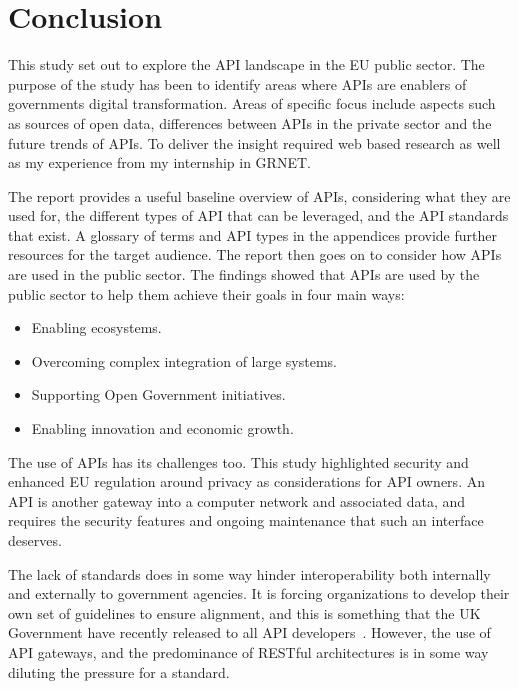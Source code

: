 \chapter{Conclusion}

\ifpdf
\graphicspath{{Conclusion/Figs/Raster/}{Conclusion/Figs/PDF/}{Conclusion/Figs/}}
\else
\graphicspath{{Conclusion/Figs/Vector/}{Conclusion/Figs/}}
\fi

This study set out to explore the API landscape in the EU public sector. The
purpose of the study has been to identify areas where APIs are enablers of governments
digital transformation. Areas of specific focus
include aspects such as sources of open data, differences between APIs in the private sector
and the future trends of APIs. To deliver the insight required web based research as well
as my experience from my internship in GRNET.

The report provides a useful baseline overview of APIs, considering what they are
used for, the different types of API that can be leveraged, and the API standards
that exist. A glossary of terms and API types in the appendices provide further
resources for the target audience. The report then goes on to consider how APIs
are used in the public sector. The findings showed that APIs are used by the public
sector to help them achieve their goals in four main ways:
\begin{itemize}
	\item Enabling ecosystems.
	\item Overcoming complex integration of large systems.
	\item Supporting Open Government initiatives.
	\item Enabling innovation and economic growth.
\end{itemize}

The use of APIs has its challenges too. This study highlighted security
and enhanced EU regulation around privacy as considerations for API owners. An API
is another gateway into a computer network and associated data, and requires the security features and ongoing maintenance that such an interface deserves.

The lack of standards does in some way hinder interoperability both internally and
externally to government agencies. It is forcing organizations to develop their own set of guidelines to ensure alignment, and this is something that the UK
Government have recently released to all API developers~\citep{gov_uk_api}. However, the use
of API gateways, and the predominance of RESTful architectures is in some way diluting
the pressure for a standard.

